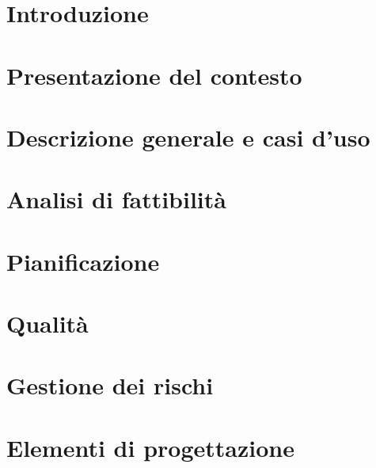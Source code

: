 


\def\DOCUMENTO 		{Piano di Progetto\\}
\def\VERSIONE 		{1.0.0\\}

\def\REDATTORI		{}

\def\VERIFICATORI	{}

\def\RESPONSABILE	{}

\def\USO			{}

\def\DISTRIBUZIONE	{\GRUPPO{}\\
					& \COMMITTENTE{}\\}

\def\DESCRIZIONE	{}

\def\INDICE		{true} 		%
\def\TABELLE	{true} 		%
\def\FIGURE		{true} 		%




\section{Introduzione}

\newpage

\section{Presentazione del contesto}

\newpage

\section{Descrizione generale e casi d'uso}

\newpage

\section{Analisi di fattibilità}

\newpage

\section{Pianificazione}

\newpage

\section{Qualità}

\newpage


\section{Gestione dei rischi}

\newpage

\section{Elementi di progettazione}



